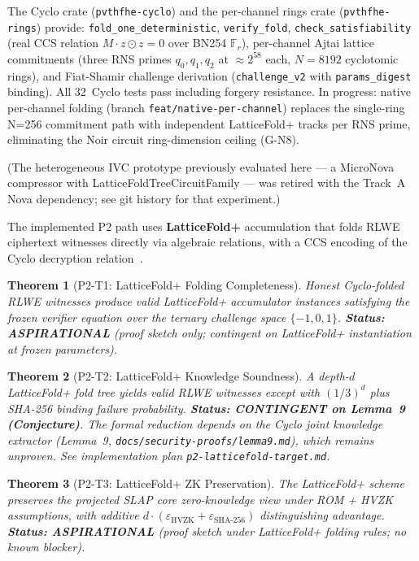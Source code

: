 \documentclass{llncs}
\newtheorem{theorem}{Theorem}[section]
\begin{document}
The Cyclo crate (\texttt{pvthfhe-cyclo}) and the per-channel rings crate (\texttt{pvthfhe-rings}) provide:
\texttt{fold\_one\_deterministic}, \texttt{verify\_fold},
\texttt{check\_satisfiability} (real CCS relation $M \cdot z \odot z = 0$
over BN254 $\mathbb{F}_r$), per-channel Ajtai lattice commitments (three RNS
primes $q_0,q_1,q_2$ at $\approx 2^{58}$ each, $N=8192$ cyclotomic rings),
and Fiat-Shamir challenge derivation (\texttt{challenge\_v2} with
\texttt{params\_digest} binding).  All 32~Cyclo tests pass including forgery
resistance.  In progress: native per-channel folding (branch
\texttt{feat/native-per-channel}) replaces the single-ring N=256 commitment
path with independent LatticeFold+ tracks per RNS prime, eliminating the
Noir circuit ring-dimension ceiling (G-N8).

(The heterogeneous IVC prototype previously evaluated here — a MicroNova
compressor with LatticeFoldTreeCircuitFamily — was retired with the
Track~A Nova dependency; see git history for that experiment.)

The implemented P2 path uses \textbf{LatticeFold+} accumulation that folds
RLWE ciphertext witnesses directly via algebraic relations, with a CCS
encoding of the Cyclo decryption relation~\cite{cyclo2025,latticefold2024}.

\begin{theorem}[P2-T1: LatticeFold+ Folding Completeness]
\label{thm:p2-t1}
Honest Cyclo-folded RLWE witnesses produce valid LatticeFold+ accumulator
instances satisfying the frozen verifier equation over the ternary challenge
space $\{-1,0,1\}$.
\textbf{Status: ASPIRATIONAL} (proof sketch only; contingent on
LatticeFold+ instantiation at frozen parameters).
\end{theorem}

\begin{theorem}[P2-T2: LatticeFold+ Knowledge Soundness]
\label{thm:p2-t2}
A depth-$d$ LatticeFold+ fold tree yields valid RLWE witnesses except
with $(1/3)^d$ plus SHA-256 binding failure probability.
\textbf{Status: CONTINGENT on Lemma~9 (Conjecture)}.
The formal reduction depends on the Cyclo joint knowledge extractor
(Lemma~9, \texttt{docs/security-proofs/lemma9.md}), which remains
unproven.  See implementation plan \texttt{p2-latticefold-target.md}.
\end{theorem}

\begin{theorem}[P2-T3: LatticeFold+ ZK Preservation]
\label{thm:p2-t3}
The LatticeFold+ scheme preserves the projected SLAP core zero-knowledge
view under ROM + HVZK assumptions, with additive $d \cdot (\varepsilon_{\text{HVZK}} +
\varepsilon_{\text{SHA-256}})$ distinguishing advantage.
\textbf{Status: ASPIRATIONAL} (proof sketch under
LatticeFold+ folding rules; no known blocker).
\end{theorem}
\end{document}
